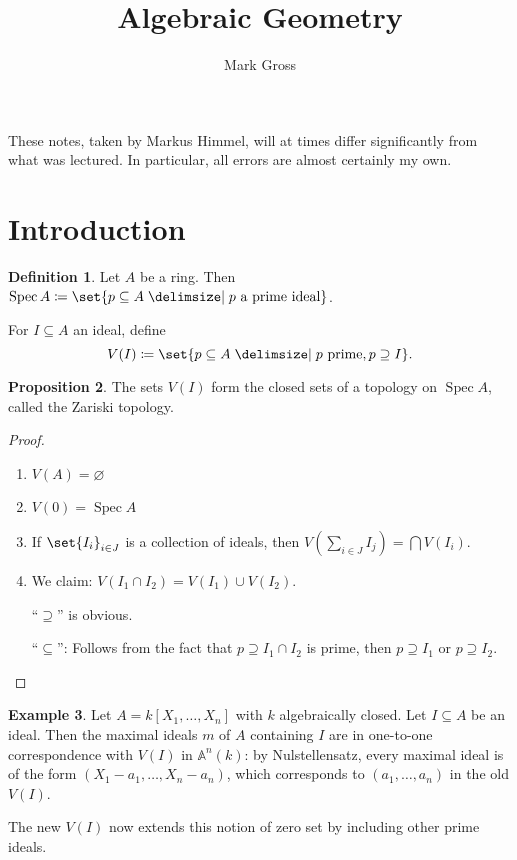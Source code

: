 \documentclass[a4paper]{amsbook}
\title{Algebraic Geometry}
\author{Mark Gross}
\theoremstyle{definition}
\newtheorem{definition}{Definition}[chapter]
\newtheorem{example}[definition]{Example}
\newtheorem{proposition}[definition]{Proposition}
\DeclareMathOperator\Spec{Spec}
\begin{document}
\maketitle

These notes, taken by Markus Himmel, will at times differ significantly from
what was lectured. In particular, all errors are almost certainly my own.

\tableofcontents

\chapter*{Introduction}
\label{Introduction}
\begin{definition}
\label{Spectrum}
Let $A $ be a ring. Then $\Spec A\coloneqq \set{p \subseteq A\given p\text{ a prime ideal}}$.

For $I \subseteq A$ an ideal, define
\[ V(I)\coloneqq \set{p \subseteq A\given p\text{ prime}, p\supseteq I}. \]
\end{definition}

\begin{proposition}
\label{ZariskiTopology}
The sets $V(I)$ form the closed sets of a topology on $\Spec A$, called the
Zariski topology.
\end{proposition}
\begin{proof}[Proof]
\begin{enumerate}
	\item $V(A) = \varnothing$
	\item $V(0) = \Spec A$
	\item If $\set{I_i}_{i \in J}$ is a collection of ideals, then
		$V(\sum_{i \in J} I_j) = \bigcap V(I_i)$.
	\item We claim: $V(I_1 \cap I_2) = V(I_1) \cup V(I_2)$.

		\enquote{$\supseteq$} is obvious.

		\enquote{$\subseteq$}: Follows from the fact that $p\supseteq I_1\cap I_2$ is prime, then
		$p\supseteq I_1$ or $p\supseteq I_2$.
\end{enumerate}
\end{proof}

\begin{example}
\label{PolynomialRing}
Let $A = k[X_1, \ldots, X_n]$ with $k$ algebraically closed. Let $I \subseteq A$
be an ideal. Then the maximal ideals $m$ of  $A$ containing $I$ are in one-to-one
correspondence with $V(I)$ in $\mathbb{A}^n(k)$: by Nulstellensatz, every
maximal ideal is of the form $(X_1 - a_1, \ldots, X_n - a_n)$, which corresponds
to $(a_1, \ldots, a_n)$ in the old $V(I)$.

The new $V(I)$ now extends this notion of zero set by including other prime
ideals.
\end{example}
\end{document}
